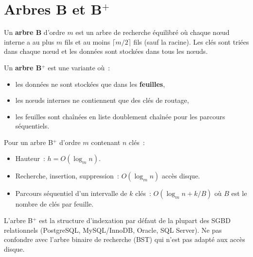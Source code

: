 \section{Arbres B et B$^+$}

\begin{definition}
Un \textbf{arbre B} d'ordre $m$ est un arbre de recherche \'equilibr\'e
o\`u chaque n\oe ud interne a au plus $m$ fils et au moins $\lceil m/2 \rceil$
fils (sauf la racine). Les cl\'es sont tri\'ees dans chaque n\oe ud et les
donn\'ees sont stock\'ees dans tous les n\oe uds.
\end{definition}

\begin{definition}[Arbre B$^+$]
Un \textbf{arbre B$^+$} est une variante o\`u~:
\begin{itemize}
  \item les donn\'ees ne sont stock\'ees que dans les \textbf{feuilles},
  \item les n\oe uds internes ne contiennent que des cl\'es de routage,
  \item les feuilles sont cha\^in\'ees en liste doublement cha\^in\'ee
        pour les parcours s\'equentiels.
\end{itemize}
\end{definition}

\begin{proposition}
Pour un arbre B$^+$ d'ordre $m$ contenant $n$ cl\'es~:
\begin{itemize}
  \item Hauteur~: $h = O(\log_m n)$.
  \item Recherche, insertion, suppression~: $O(\log_m n)$ acc\`es disque.
  \item Parcours s\'equentiel d'un intervalle de $k$ cl\'es~: $O(\log_m n + k/B)$
        o\`u $B$ est le nombre de cl\'es par feuille.
\end{itemize}
\end{proposition}

\begin{attention}
L'arbre B$^+$ est la structure d'indexation par d\'efaut de la plupart
des SGBD relationnels (PostgreSQL, MySQL/InnoDB, Oracle, SQL Server).
Ne pas confondre avec l'arbre binaire de recherche (BST) qui n'est pas
adapt\'e aux acc\`es disque.
\end{attention}

